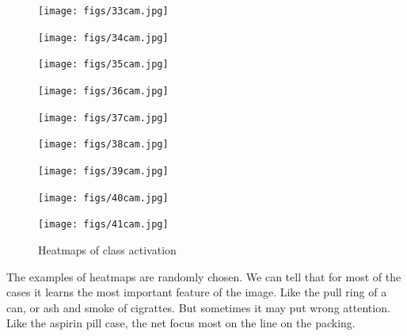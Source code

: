 \begin{figure}[H]
\begin{minipage}[t]{.3\linewidth}
    \centering
    \texttt{[image: figs/33cam.jpg]}
    
  \end{minipage}
  \hfill
\begin{minipage}[t]{.3\linewidth}
    \centering
    \texttt{[image: figs/34cam.jpg]}
    
  \end{minipage}
  \hfill
  \begin{minipage}[t]{.3\linewidth}
    \centering
    \texttt{[image: figs/35cam.jpg]}
    
  \end{minipage}
  \hfill
  \begin{minipage}[t]{.3\linewidth}
    \centering
    \texttt{[image: figs/36cam.jpg]}
    
  \end{minipage}
  \hfill
\begin{minipage}[t]{.3\linewidth}
    \centering
    \texttt{[image: figs/37cam.jpg]}
    
  \end{minipage}
  \hfill
  \begin{minipage}[t]{.3\linewidth}
    \centering
    \texttt{[image: figs/38cam.jpg]}
    
  \end{minipage}
  \hfill
  \begin{minipage}[t]{.3\linewidth}
    \centering
    \texttt{[image: figs/39cam.jpg]}
    
  \end{minipage}
  \hfill
  \begin{minipage}[t]{.3\linewidth}
    \centering
    \texttt{[image: figs/40cam.jpg]}
    
  \end{minipage}
  \hfill
\begin{minipage}[t]{.3\linewidth}
    \centering
    \texttt{[image: figs/41cam.jpg]}
   
  \end{minipage}
  \hfill

  \caption{Heatmaps of class activation}
  \vspace{-3mm}
  
\end{figure}

The examples of heatmaps are randomly chosen. We can tell that for most of the cases it learns the most important feature of the image. Like the pull ring of a can, or ash and smoke of cigrattes. But sometimes it may put wrong attention. Like the aspirin pill case, the net focus most on the line on the packing.